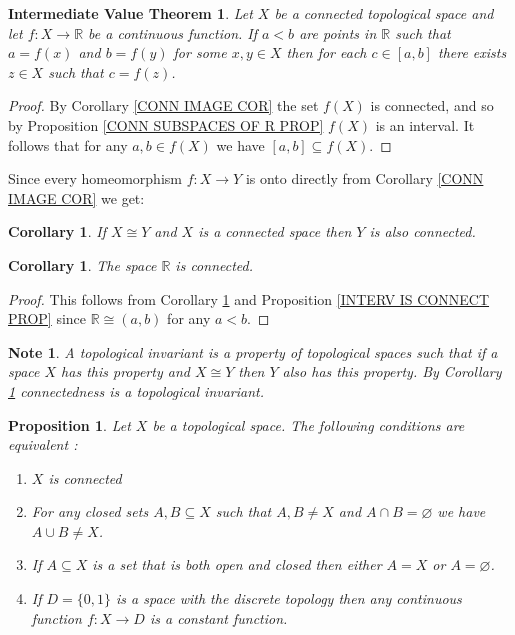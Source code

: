 \documentclass[11pt, letterpaper, oneside]{report}
\theoremstyle{pplain}
\newtheorem{proposition}[theorem]{Proposition}
\newtheorem{corollary}[theorem]{Corollary}
\newtheorem{ITERMVALUE THM}[theorem]{Intermediate Value Theorem}
\newtheorem{HEINEBOREL THM}[theorem]{Heine-Borel Theorem}
\newtheorem{UMETR THM}[theorem]{Urysohn Metrization Theorem}
\newtheorem{UMETR2 THM}[theorem]{Urysohn Metrization Theorem (v.2)}
\theoremstyle{ddefinition}
\newtheorem{note}[theorem]{Note}
\theoremstyle{nnn}
\newtheorem{TDA NN}[theorem]{Topological Data Analysis. }
\theoremstyle{eexercise}
\newcommand{\R}{{\mathbb R}}
\newcommand{\benu}{\begin{enumerate}}
\newcommand{\eenu}{\end{enumerate}}
\begin{document}
\begin{ITERMVALUE THM}
\label{ITNVAL THM}
Let $X$ be a connected topological space and let $f\colon X\to \R$ be a continuous 
function. If $a<b$ are points in $\R$ such that $a= f(x)$ and $b= f(y)$ for some 
$x, y\in X$ then for each $c\in [a, b]$ there exists $z\in X$ such that  $c= f(z)$.   
\end{ITERMVALUE THM}

\begin{proof}
By Corollary \ref{CONN IMAGE COR} the set $f(X)$ is connected, and so by  
Proposition \ref{CONN SUBSPACES OF R PROP} $f(X)$ is an interval. It follows that for any
$a, b \in f(X)$ we have $[a, b]\subseteq f(X)$. 
\end{proof}


Since every homeomorphism $f\colon X \to Y$ is onto directly from Corollary 
\ref{CONN IMAGE COR} we get:  

\begin{corollary}
\label{CONN HOMEO INV COR}
If $X\cong Y$ and $X$ is a connected space then $Y$ is also connected. 
\end{corollary}

\begin{corollary}
The space $\R$ is connected. 
\end{corollary}

\begin{proof}
This follows from Corollary \ref{CONN HOMEO INV COR} and 
Proposition \ref{INTERV IS CONNECT PROP}  since $\R\cong (a, b)$ for any $a< b$.  
\end{proof}


\begin{note}
A \emph{topological invariant} is a property of topological spaces such that if a space 
$X$ has this property and $X\cong Y$ then $Y$ also has this property. By 
Corollary \ref{CONN HOMEO INV COR} connectedness  is a topological invariant. 
\end{note}


\begin{proposition}
\label{CONNECT EQUIV COND PROP}
Let $X$ be a topological space. The following conditions are equivalent :
\benu
\item $X$ is connected
\item For any closed sets $A, B \subseteq X$ such that $A, B \neq X$ and $A\cap B = \varnothing$
we have $A\cup B \neq X$. 
\item If $A\subseteq X$ is a set that is both open and closed then either $A= X$ or $A= \varnothing$. 
\item If $D= \{0, 1\}$ is a space with the discrete topology then any continuous function $f\colon X\to D$ is a constant function. 
\eenu
\end{proposition}
\end{document}
